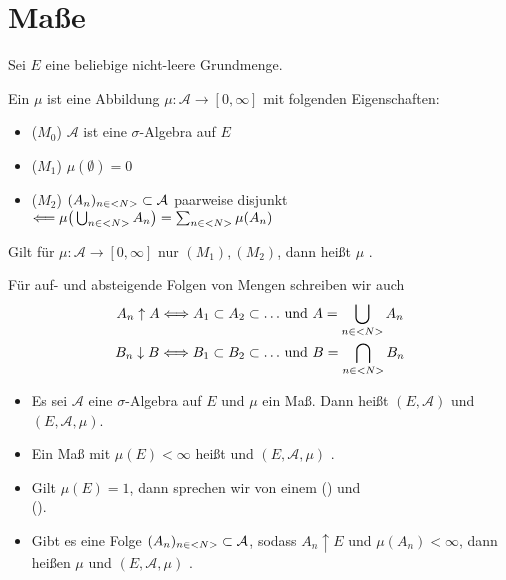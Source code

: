 \section{Maße}

Sei $E$ eine beliebige nicht-leere Grundmenge.

\begin{definition}[Maß]
	Ein  $\mu$ ist eine Abbildung $\mu: \mathcal{A} \to [0,\infty]$ mit folgenden Eigenschaften:
	\begin{itemize}
		\item ($M_0$) $\mathcal{A}$ ist eine $\sigma$-Algebra auf $E$
		\item ($M_1$) $\mu(\emptyset) = 0$
		\item ($M_2$) $(A_n)_{n \in <N>} \subset \mathcal{A}$ paarweise disjunkt $\Longleftarrow \mu\big(\bigcup_{n\in <N>} A_n\big) = \sum_{n\in <N>} \mu(A_n)$
	\end{itemize}
	Gilt für $\mu: \mathcal{A} \to [0,\infty]$ nur $(M_1),(M_2)$, dann heißt $\mu$ .
\end{definition}

Für auf- und absteigende Folgen von Mengen schreiben wir auch
\begin{align}
	A_n \uparrow A \Longleftrightarrow A_1 \subset A_2 \subset \dots &\text{ und } A = \bigcup_{n\in <N>} A_n \notag \\
	B_n \downarrow B \Longleftrightarrow B_1 \subset B_2 \subset \dots &\text{ und } B = \bigcap_{n\in <N>} B_n \notag
\end{align}

\begin{definition}
	\begin{itemize}
		\item Es sei $\mathcal{A}$ eine $\sigma$-Algebra auf $E$ und $\mu$ ein Maß. Dann heißt $(E,\mathcal{A})$  und $(E,\mathcal{A},\mu)$.
		\item Ein Maß mit $\mu(E) < \infty$ heißt  und $(E,\mathcal{A},\mu)$ .
		\item Gilt $\mu(E)=1$, dann sprechen wir von einem  () und \\  ().
		\item Gibt es eine Folge $(A_n)_{n\in <N>} \subset \mathcal{A}$, sodass $A_n \uparrow E$ und $\mu(A_n) < \infty$, dann heißen $\mu$ und $(E,\mathcal{A},\mu)$ .
	\end{itemize}
\end{definition}

